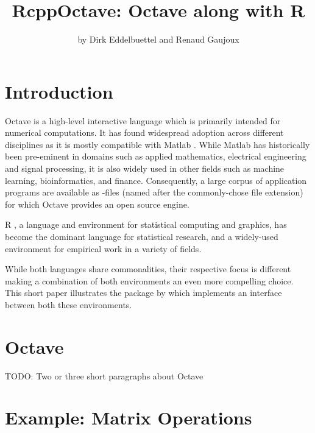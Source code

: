 


\title{RcppOctave: Octave along with R}  %
\author{by Dirk Eddelbuettel and Renaud Gaujoux}

\maketitle


\section{Introduction}

Octave \citep{Eaton:2008} is a high-level interactive language which is
primarily intended for numerical computations.  It has found widespread
adoption across different disciplines as it is mostly compatible with Matlab
\citep{MATLAB:2010}.  While Matlab has historically been pre-eminent in
domains such as applied mathematics, electrical engineering and signal
processing, it is also widely used in other fields such as machine
learning, %
bioinformatics, and finance.  Consequently, a large corpus of application
programs are available as -files (named after the commonly-chose
file extension) for which Octave provides an open source engine.

R \citep{R:2012}, a language and environment for statistical
computing and graphics, has become the dominant language for statistical
research, and a widely-used environment for empirical work in a variety of
fields. %

While both languages share commonalities, their respective focus is different
making a combination of both environments an even more compelling choice.
This short paper illustrates the  package by
\cite{CRAN:RcppOctave} which implements an interface between both these
environments.

\section{Octave}

TODO: Two or three short paragraphs about Octave

\section{Example: Matrix Operations}  %

